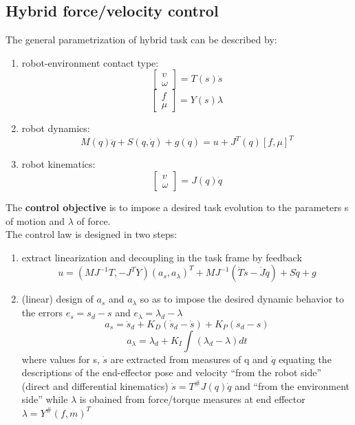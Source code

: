 \documentclass[a4paper,12pt]{article}
\begin{document}
\subsection{Hybrid force/velocity control}
The general parametrization of hybrid task can be 
described by:\begin{enumerate}
    \item robot-environment contact type:
    \begin{equation}
        \begin{bmatrix}
            v \\
            \omega
        \end{bmatrix}
        =T(s)\dot{s}
    \end{equation}
    \begin{equation}
        \begin{bmatrix}
            f \\
            \mu
        \end{bmatrix}
        =Y(s)\lambda
    \end{equation}
    \item robot dynamics: \begin{equation} \label{eq:robot dynamics in hybrid control}
    M(q)\ddot{q}+S(q,\dot{q})+g(q)=u+J^T(q)[f,\mu]^T
    \end{equation}
    \item robot kinematics:\begin{equation}
    \begin{bmatrix}
        v\\
        \omega
    \end{bmatrix}=J(q)\dot{q}
    \end{equation}
\end{enumerate}
The \textbf{control objective} is to impose a desired task evolution 
to the parameters s of motion and $\lambda$ of force.\\
The control law is designed in two steps:
\begin{enumerate}
    \item extract linearization and decoupling in the task frame by feedback
            \begin{equation}
            u=(MJ^{-1}T, -J^TY)(a_s, a_{\lambda})^T + MJ^{-1}(\dot{T}\dot{s}-\dot{J}\dot{q}) + S\dot{q} +g
            \end{equation}
    \item (linear) design of  $a_s$ and $a_{\lambda}$ so as to impose 
the desired dynamic
behavior to the errors $e_s = s_d - s$ and $e_{\lambda} = \lambda_d - \lambda$
\begin{equation}
a_s=\ddot{s}_d+ K_D(\dot{s}_d-\dot{s})+K_P(s_d-s)
\end{equation}
\begin{equation}
a_{\lambda}=\lambda_d + K_I \int(\lambda_d-\lambda)dt
\end{equation}
where values for s, $\dot{s}$ are extracted from measures 
of q and $\dot{q}$ equating the descriptions
of the end-effector pose and velocity “from the robot side”
 (direct and
differential kinematics) $\dot{s}=T^{\#}J(q)\dot{q}$ and “from the environment side” while 
$\lambda$ is obained from 
force/torque measures at end effector $\lambda=Y^{\#}(f,m)^T$
\end{enumerate}
\end{document}
